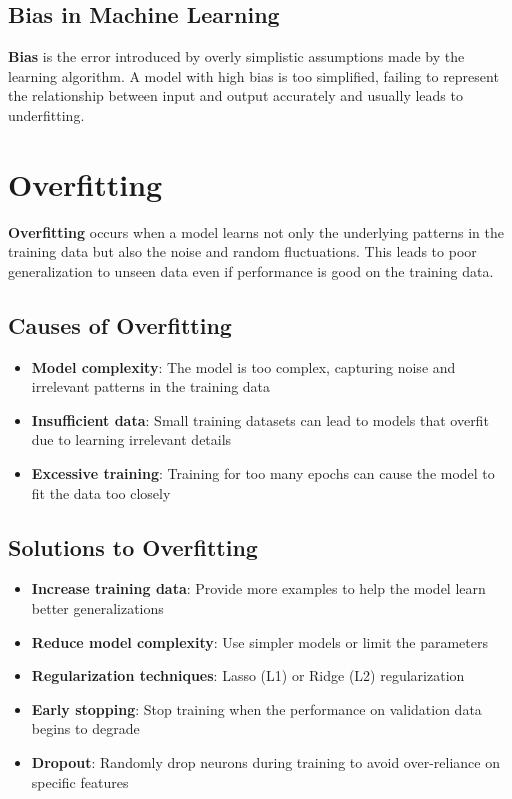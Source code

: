 \documentclass{article}
\begin{document}
\subsection*{Bias in Machine Learning}

\textbf{Bias} is the error introduced by overly simplistic assumptions made by the learning algorithm. A model with high bias is too simplified, failing to represent the relationship between input and output accurately and usually leads to underfitting.

\section*{Overfitting}

\textbf{Overfitting} occurs when a model learns not only the underlying patterns in the training data but also the noise and random fluctuations. This leads to poor generalization to unseen data even if performance is good on the training data.

\subsection*{Causes of Overfitting}

\begin{itemize}
    \item \textbf{Model complexity}: The model is too complex, capturing noise and irrelevant patterns in the training data
    \item \textbf{Insufficient data}: Small training datasets can lead to models that overfit due to learning irrelevant details
    \item \textbf{Excessive training}: Training for too many epochs can cause the model to fit the data too closely
\end{itemize}

\subsection*{Solutions to Overfitting}

\begin{itemize}
    \item \textbf{Increase training data}: Provide more examples to help the model learn better generalizations
    \item \textbf{Reduce model complexity}: Use simpler models or limit the parameters
    \item \textbf{Regularization techniques}: Lasso (L1) or Ridge (L2) regularization
    \item \textbf{Early stopping}: Stop training when the performance on validation data begins to degrade
    \item \textbf{Dropout}: Randomly drop neurons during training to avoid over-reliance on specific features
\end{itemize}
\end{document}
